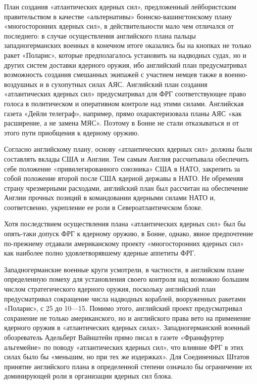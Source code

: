 \documentclass[12pt, a4paper, openany]{book}
\begin{document}
		План создания «атлантических ядерных сил», предложенный лейбористским правительством в качестве «альтернативы» боннско-вашингтонскому плану «многосторонних ядерных сил», в действительности мало чем отличался от последнего: в случае осуществления английского плана пальцы западногерманских военных в конечном итоге оказались бы на кнопках не только ракет «Поларис», которые предполагалось установить на надводных судах, но и других систем доставки ядерного оружия, ибо английский план предусматривал возможность создания смешанных экипажей с участием немцев также в военно-воздушных и в сухопутных силах АЯС. Английский план создания «атлантических ядерных сил» предусматривал для ФРГ соответствующее право голоса в политическом и оперативном контроле над этими силами. Английская газета «Дейли телеграф», например, прямо охарактеризовала планы АЯС «как расширение, а не замена МЯС». Поэтому в Бонне не стали отказываться и от этого пути приобщения к ядерному оружию.
		
		Согласно английскому плану, основу «атлантических ядерных сил» должны были составлять вклады США и Англии. Тем самым Англия рассчитывала обеспечить себе положение «привилегированного союзника» США в НАТО, закрепить за собой положение второй после США ядерной державы в НАТО. Не обременяя страну чрезмерными расходами, английский план был рассчитан на обеспечение Англии прочных позиций в командовании ядерными силами НАТО и, соответсвенно, укрепление ее роли в Североатлантическом блоке.
		
		Хотя последствием осуществления плана «атлантических ядерных сил» был бы опять-таки допуск ФРГ к ядерному оружию, в Бонне, однако, явное предпочтение по-прежнему отдавали американскому проекту «многосторонних ядерных сил» как наиболее полно удовлетворявшему ядерные аппетиты ФРГ.
		
		Западногерманские военные круги усмотрели, в частности, в английском плане определенную помеху для установления своего контроля над возможно большим числом стратегического ядерного оружия, поскольку английский план предусматривал сокращение числа надводных кораблей, вооруженных ракетами «Поларис», с 25 до 10—15. Помимо этого, английский проект предусматривал сохранение не только американского, но и английского права вето на применение ядерного оружия в «атлантических ядерных силах». Западногерманский военный обозреватель Адельберт Вайнштейн прямо писал в газете «Франкфуртер альгемейне» по поводу «атлантических ядерных сил», что влияние ФРГ в этих силах было бы «меньшим, но при тех же издержках». Для Соединенных Штатов принятие английского плана в определенной степени означало бы ограничение их доминирующей роли в организации ядерных сил блока.
		
\end{document}
